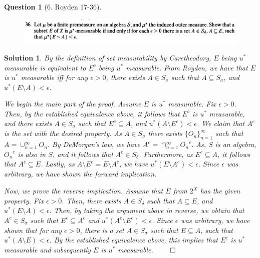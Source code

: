 \documentclass{article} %
\theoremstyle{quest}
\newtheorem*{question}{Question}
\newtheorem*{solution}{Solution}
\begin{document}
\begin{question}[6. Royden 17-36]
\hfill
\begin{figure}[h!]
  \centering
    \includegraphics[width=1\textwidth]{17-36.png}
\end{figure}
\end{question}
\begin{solution}
By the definition of set measurability by Caretheodory, $E$ being
$u^*$ measurable is equivalent to $E^c$ being $u^*$ measurable. From Royden,
we have that $E$ is $u^*$ measurable iff for any $\epsilon > 0$,
there exists $A \in S_{\sigma}$ 
such that $A \subseteq S_{\sigma}$, and $u^{*}(E\setminus A) < \epsilon $.

\smallskip
 
We begin the main part of the proof.
Assume $E$ is $u^*$ measurable. Fix $\epsilon > 0$.
Then, by the established equivalence above,
it follows that $E^c$ is $u^*$ measurable, and there exists $A \in S_{\sigma}$
such that $E^c \subseteq A$, and $u^{*}(A \setminus E^c) < \epsilon $.
We claim that $A^c$ is the set with the desired property. As $A \in S_{\sigma}$
there exists $\{ O_n \}_{n=1}^{\infty}$ such that $A = \cup_{n=1}^{\infty}
O_n$. By DeMorgan's law, we have $A^c = \cap_{n=1}^{\infty} {O_n}^{c}$. As,
$S$ is an algebra, ${O_n}^c$ is also in $S$, and it follows that $A^c \in 
S_{\delta}$. Furthermore, as $E^c \subseteq A$, it follows that $A^c \subseteq
E$. Lastly, as $A \setminus E^c = E \setminus A^c$, we have $u^{*}(
E \setminus A^c) < \epsilon$. Since $\epsilon$ was arbitrary, we have shown
the forward implication. 

Now, we prove the reverse implication. Assume that $E$ from $2^X$ has the
given property.  
Fix $\epsilon > 0$. Then, there exists $A \in S_{\delta}$ such that $A \subseteq
E$, and $u^{*}(E\setminus A) < \epsilon$. Then, by taking the argument
above in reverse, we obtain that $A^c \in S_{\sigma}$ such that 
$E^c \subseteq A^c$ and $u^{*}(A^c \setminus E^c) < \epsilon$. Since $\epsilon$
was arbitrary, we have shown that for any $\epsilon > 0$, there is a set
$A \in S_{\sigma}$ such that $E \subseteq A$, such that $u^{*}(A\setminus E)
<\epsilon$. By the established equivalence above, this implies that $E^c$ 
is $u^*$ measurable and subsequently $E$ is $u^*$ measurable.
\hfill $\qed$
 

\end{solution}
\end{document}
